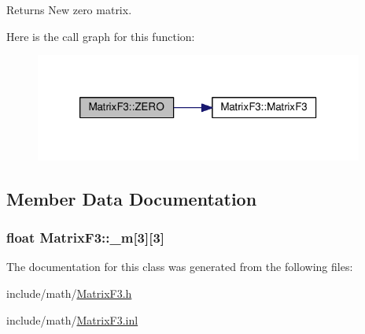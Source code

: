 \begin{DoxyReturn}{Returns}
New zero matrix. 
\end{DoxyReturn}


Here is the call graph for this function\-:
\nopagebreak
\begin{figure}[H]
\begin{center}
\leavevmode
\includegraphics[width=306pt]{classMatrixF3_a489e82306b03ff5d69929b5f358ccdb4_cgraph}
\end{center}
\end{figure}




\subsection{Member Data Documentation}
\hypertarget{classMatrixF3_abdc6de748007031ab31d86cc54ada59f}{
\subsubsection[{\-\_\-m}]{\setlength{\rightskip}{0pt plus 5cm}float Matrix\-F3\-::\-\_\-m\mbox{[}3\mbox{]}\mbox{[}3\mbox{]}}}\label{classMatrixF3_abdc6de748007031ab31d86cc54ada59f}


The documentation for this class was generated from the following files\-:\begin{DoxyCompactItemize}
\item 
include/math/\hyperlink{MatrixF3_8h}{Matrix\-F3.\-h}\item 
include/math/\hyperlink{MatrixF3_8inl}{Matrix\-F3.\-inl}\end{DoxyCompactItemize}
